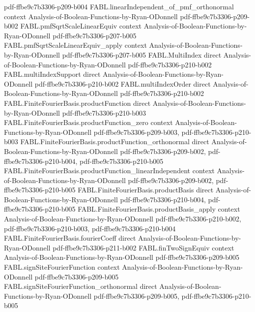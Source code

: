 \begin{theorem}
  {pdf-ffbe9c7b3306-p209-b004}
\proofstep
  {FABL.linearIndependent_of_pmf_orthonormal}
  {context}
  {Analysis-of-Boolean-Functions-by-Ryan-ODonnell}
  {pdf-ffbe9c7b3306-p209-b002}
\proofstep
  {FABL.pmfSqrtScaleLinearEquiv}
  {context}
  {Analysis-of-Boolean-Functions-by-Ryan-ODonnell}
  {pdf-ffbe9c7b3306-p207-b005}
\proofstep
  {FABL.pmfSqrtScaleLinearEquiv_apply}
  {context}
  {Analysis-of-Boolean-Functions-by-Ryan-ODonnell}
  {pdf-ffbe9c7b3306-p207-b005}
\proofstep
  {FABL.MultiIndex}
  {direct}
  {Analysis-of-Boolean-Functions-by-Ryan-ODonnell}
  {pdf-ffbe9c7b3306-p210-b002}
\proofstep
  {FABL.multiIndexSupport}
  {direct}
  {Analysis-of-Boolean-Functions-by-Ryan-ODonnell}
  {pdf-ffbe9c7b3306-p210-b002}
\proofstep
  {FABL.multiIndexOrder}
  {direct}
  {Analysis-of-Boolean-Functions-by-Ryan-ODonnell}
  {pdf-ffbe9c7b3306-p210-b002}
\proofstep
  {FABL.FiniteFourierBasis.productFunction}
  {direct}
  {Analysis-of-Boolean-Functions-by-Ryan-ODonnell}
  {pdf-ffbe9c7b3306-p210-b003}
\proofstep
  {FABL.FiniteFourierBasis.productFunction_zero}
  {context}
  {Analysis-of-Boolean-Functions-by-Ryan-ODonnell}
  {pdf-ffbe9c7b3306-p209-b003,
    pdf-ffbe9c7b3306-p210-b003}
\proofstep
  {FABL.FiniteFourierBasis.productFunction_orthonormal}
  {direct}
  {Analysis-of-Boolean-Functions-by-Ryan-ODonnell}
  {pdf-ffbe9c7b3306-p209-b002,
    pdf-ffbe9c7b3306-p210-b004,
    pdf-ffbe9c7b3306-p210-b005}
\proofstep
  {FABL.FiniteFourierBasis.productFunction_linearIndependent}
  {context}
  {Analysis-of-Boolean-Functions-by-Ryan-ODonnell}
  {pdf-ffbe9c7b3306-p209-b002,
    pdf-ffbe9c7b3306-p210-b005}
\proofstep
  {FABL.FiniteFourierBasis.productBasis}
  {direct}
  {Analysis-of-Boolean-Functions-by-Ryan-ODonnell}
  {pdf-ffbe9c7b3306-p210-b004,
    pdf-ffbe9c7b3306-p210-b005}
\proofstep
  {FABL.FiniteFourierBasis.productBasis_apply}
  {context}
  {Analysis-of-Boolean-Functions-by-Ryan-ODonnell}
  {pdf-ffbe9c7b3306-p210-b002,
    pdf-ffbe9c7b3306-p210-b003,
    pdf-ffbe9c7b3306-p210-b004}
\proofstep
  {FABL.FiniteFourierBasis.fourierCoeff}
  {direct}
  {Analysis-of-Boolean-Functions-by-Ryan-ODonnell}
  {pdf-ffbe9c7b3306-p211-b002}
\proofstep
  {FABL.finTwoSignEquiv}
  {context}
  {Analysis-of-Boolean-Functions-by-Ryan-ODonnell}
  {pdf-ffbe9c7b3306-p209-b005}
\proofstep
  {FABL.signSiteFourierFunction}
  {context}
  {Analysis-of-Boolean-Functions-by-Ryan-ODonnell}
  {pdf-ffbe9c7b3306-p209-b005}
\proofstep
  {FABL.signSiteFourierFunction_orthonormal}
  {direct}
  {Analysis-of-Boolean-Functions-by-Ryan-ODonnell}
  {pdf-ffbe9c7b3306-p209-b005,
    pdf-ffbe9c7b3306-p210-b005}
\proofstep

\end{theorem}
